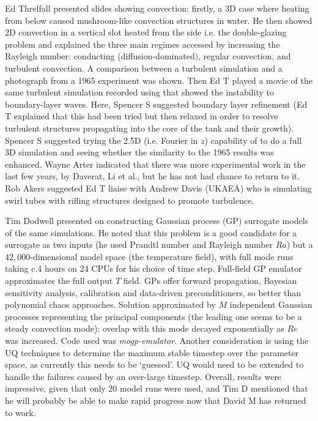 Ed Threlfall presented slides showing convection: firstly, a 3D case where 
heating from below caused mushroom-like convection structures in water.  He 
then showed 2D convection in a vertical slot heated from the side i.e. the 
double-glazing problem and explained the three main regimes accessed by 
increasing the Rayleigh number: conducting (diffusion-dominated), regular 
convection, and turbulent convection.  A comparison between a turbulent 
simulation and a photograph from a 1965 experiment was shown.  Then 
Ed T played a movie of the same turbulent simulation recorded using 
that showed the instability to boundary-layer waves.  Here, Spencer S 
suggested boundary layer refinement (Ed T explained that this had been tried 
but then relaxed in order to resolve turbulent structures propagating into the 
core of the tank and their growth).  Spencer S suggested trying the 2.5D (i.e. 
Fourier in $z$) capability of  to do a full 3D simulation and 
seeing whether the similarity to the 1965 results was enhanced.  Wayne Arter
indicated that there was more experimental work in the last few years, by 
Daverat, Li et al., but he has not had chance to return to it.  Rob Akers 
suggested Ed T liaise with Andrew Davis (UKAEA) who is simulating swirl tubes 
with rifling structures designed to promote turbulence.

Tim Dodwell presented on constructing Gaussian process (GP) surrogate models of 
the same  simulations.  He noted that this problem is a good 
candidate for a surrogate as two inputs (he used Prandtl number and Rayleigh
number $Ra$) but a $42,000$-dimensional model space (the temperature field), 
with full mode runs taking c.4 hours on 24 CPUs for his choice of time step.  
Full-field GP emulator approximates the full output $T$ field.  GPs offer 
forward propagation, Bayesian sensitivity analysis, calibration and data-driven 
preconditioners, so better than polynomial chaos approaches.  Solution 
approximated by $M$ independent Gaussian processes representing the principal 
components (the leading one seems to be a steady convection mode): overlap with 
this mode decayed exponentially as $Re$ was increased.  Code used was {\it mogp-emulator}.
Another consideration is using the UQ techniques to determine 
the maximum stable timestep over the parameter space, as currently this needs 
to be `guessed'.  UQ would need to be extended to handle the failures caused by 
an over-large timestep.  Overall, results were impressive, given that only 20 
model runs were used, and Tim D mentioned that he will probably be able to make 
rapid progress now that David M has returned to work.


